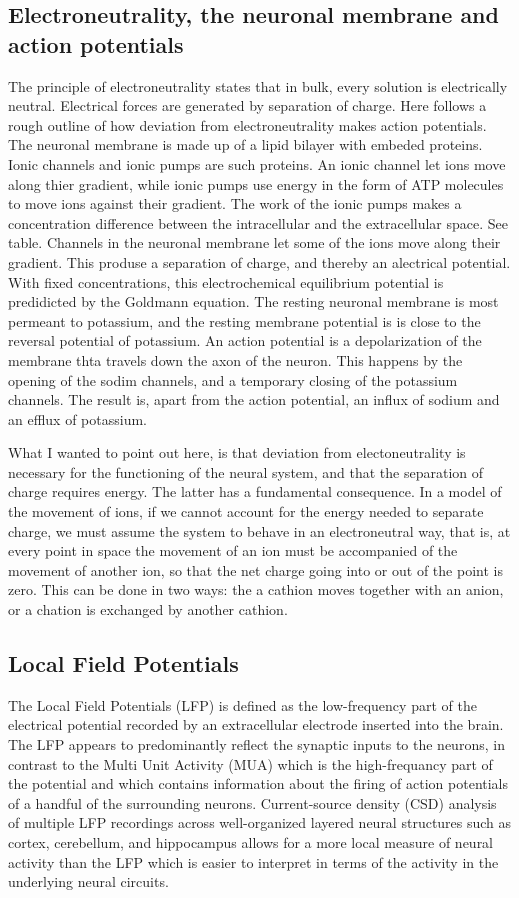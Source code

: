 \documentclass{article}
\begin{document}
\subsection{Electroneutrality, the neuronal membrane and action potentials}
The principle of electroneutrality states that in bulk, every solution is electrically neutral. Electrical forces are generated by separation of charge. Here follows a rough outline of how deviation from electroneutrality makes action potentials. The neuronal membrane is made up of a lipid bilayer with embeded proteins. Ionic channels and ionic pumps are such proteins. An ionic channel let ions move along thier gradient, while ionic pumps use energy in the form of ATP molecules to move ions against their gradient. The work of the ionic pumps makes a concentration difference between the intracellular and the extracellular space. See table. Channels in the neuronal membrane let some of the ions move along their gradient. This produse a separation of charge, and thereby an alectrical potential. With fixed concentrations, this electrochemical equilibrium potential is predidicted by the Goldmann equation. The resting neuronal membrane is most permeant to potassium,  and the resting membrane potential is is close to the reversal potential of potassium. An action potential is a depolarization of the membrane thta travels  down the axon of the neuron. This happens by the opening of the sodim channels, and a temporary closing of the potassium channels. The result is, apart from the action potential, an influx of sodium and an efflux of potassium. 

What I wanted to point out here, is that deviation from electoneutrality is necessary for the functioning of the neural system, and that the separation of charge requires energy. The latter has a fundamental consequence. In a model of the movement of ions, if we cannot account for the energy needed to separate charge, we must assume the system to behave in an electroneutral way, that is, at every point in space the movement of an ion must be accompanied of the movement of another ion, so that the net charge going into or out of the point is zero. This can be done in two ways: the a cathion moves together with an anion, or a chation is exchanged by another cathion. 
\subsection{Local Field Potentials}
The Local Field Potentials (LFP) is defined as the low-frequency part of the electrical potential recorded by an extracellular electrode
inserted into the brain. The LFP appears to predominantly reflect the synaptic inputs to the neurons, in contrast to the Multi Unit Activity (MUA) which is the high-frequancy part of the potential and  which contains information about the firing of action potentials of a handful of the
surrounding neurons.  Current-source density (CSD) analysis of multiple LFP recordings across well-organized
layered neural structures such as cortex, cerebellum, and hippocampus allows for a more local measure of neural activity than the LFP which is easier to interpret in terms of the activity in the underlying neural circuits.
\end{document}
